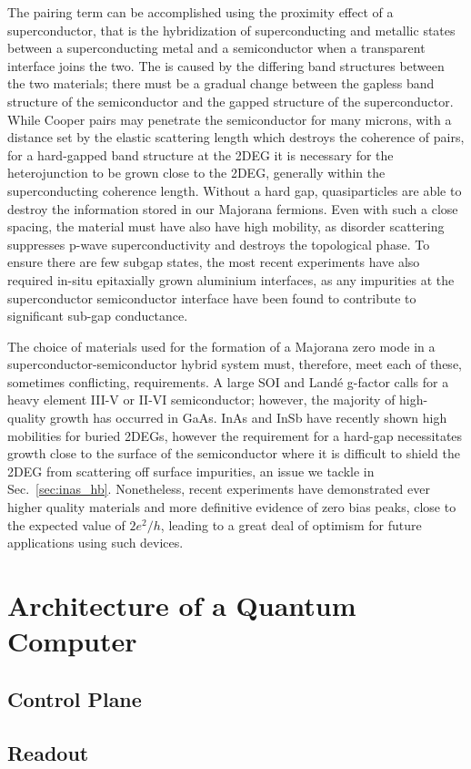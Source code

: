 The pairing term can be accomplished using the proximity effect of a superconductor, that is the hybridization of superconducting and metallic states
between a superconducting metal and a semiconductor when a transparent interface joins the two. The is caused by the differing band structures between
the two materials; there must be a gradual change between the gapless band structure of the semiconductor and the gapped structure of the superconductor.
While Cooper pairs may penetrate the semiconductor for many microns, with a distance set by the elastic scattering length which destroys the coherence
of pairs, for a hard-gapped band structure at the 2DEG it is necessary for the heterojunction to be grown close to the 2DEG, generally within the
superconducting coherence length. Without a hard gap, quasiparticles are able to destroy the information stored in our Majorana fermions. Even with such a close spacing,
the material must have also have high mobility, as disorder scattering suppresses p-wave superconductivity and destroys the topological phase\cite{PhysRevB.84.144526}.
To ensure there are few subgap states, the most recent experiments have also required in-situ epitaxially grown aluminium interfaces, as any impurities at the superconductor
semiconductor interface have been found to contribute to significant sub-gap conductance\cite{nnano.2014.306}.

The choice of materials used for the formation of a Majorana zero mode in a superconductor-semiconductor hybrid system must, therefore, meet each of these, sometimes
conflicting, requirements. A large SOI and Land\'e g-factor calls for a heavy element III-V or II-VI semiconductor; however, the majority of high-quality growth has occurred
in GaAs. InAs and InSb have recently shown high mobilities for buried 2DEGs\cite{PhysRevMaterials.2.104602,doi:10.1063/1.4993784}, however the requirement for a hard-gap necessitates growth close to the surface of the semiconductor where it is difficult to shield the 2DEG from scattering off surface impurities, an issue we
tackle in Sec.~\ref{sec:inas_hb}. Nonetheless, recent experiments have demonstrated ever higher quality materials and more definitive evidence of zero bias peaks, close
to the expected value of $2e^2/h$\cite{PhysRevLett.119.136803,nature26142}, leading to a great deal of optimism for future applications using such devices.

\section{Architecture of a Quantum Computer}
\label{sec:arch}
  \subsection{Control Plane}
  \subsection{Readout}
  \label{sec:readout}